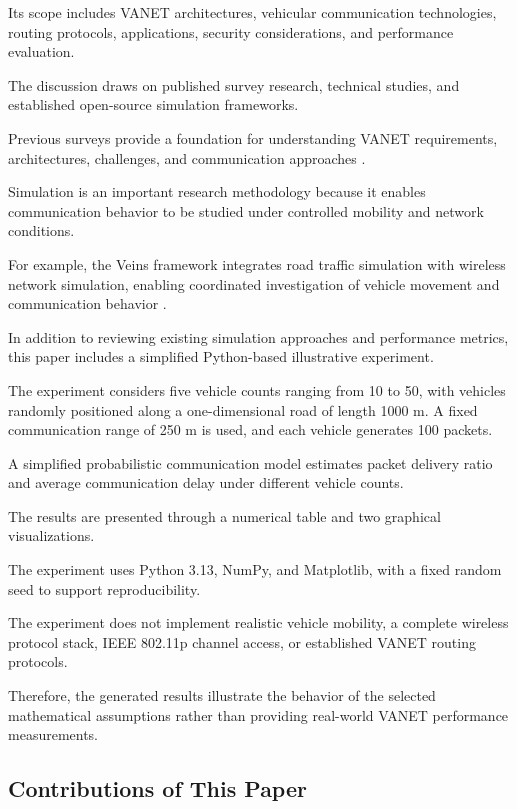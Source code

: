 Its scope includes
VANET architectures,
vehicular communication
technologies, routing
protocols, applications,
security considerations,
and performance evaluation.

The discussion draws on
published survey research,
technical studies, and
established open-source
simulation frameworks.

Previous surveys provide
a foundation for understanding
VANET requirements,
architectures, challenges,
and communication approaches
\cite{Hartenstein2008,Karagiannis2011,Zeadally2012}.

Simulation is an important
research methodology
because it enables
communication behavior
to be studied under
controlled mobility
and network conditions.

For example, the Veins
framework integrates
road traffic simulation
with wireless network
simulation, enabling
coordinated investigation
of vehicle movement
and communication
behavior \cite{Sommer2011}.

In addition to reviewing existing
simulation approaches and performance
metrics, this paper includes a
simplified Python-based illustrative
experiment.

The experiment considers five vehicle
counts ranging from 10 to 50, with
vehicles randomly positioned along
a one-dimensional road of length 1000 m.
A fixed communication range of 250 m
is used, and each vehicle generates
100 packets.

A simplified probabilistic
communication model estimates
packet delivery ratio and average
communication delay under different
vehicle counts.

The results are presented through
a numerical table and two graphical
visualizations.

The experiment uses Python 3.13,
NumPy, and Matplotlib, with a fixed
random seed to support reproducibility.

The experiment does not implement
realistic vehicle mobility, a complete
wireless protocol stack, IEEE 802.11p
channel access, or established VANET
routing protocols.

Therefore, the generated results
illustrate the behavior of the
selected mathematical assumptions
rather than providing real-world
VANET performance measurements.

\subsection{Contributions of This Paper}

